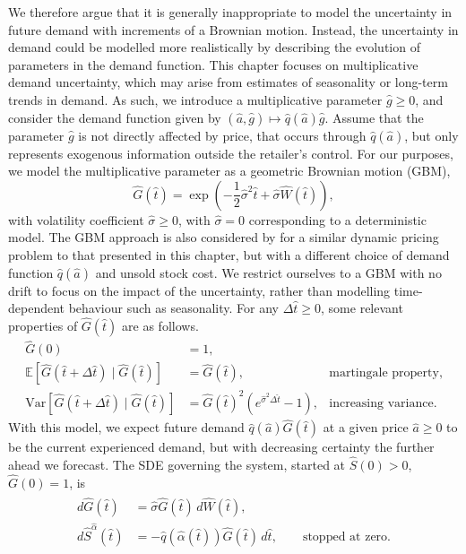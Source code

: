 \documentclass[main.tex]{subfiles}
\begin{document}
We therefore argue that it is generally inappropriate to model the uncertainty
in future demand with increments of a Brownian motion. Instead, the
uncertainty in demand could be modelled more realistically by
describing the evolution of parameters in the demand function.
This chapter focuses on multiplicative demand
uncertainty, which may arise from estimates of seasonality or
long-term trends in demand. As such, we introduce a multiplicative
parameter $\hat{g}\geq 0$, and consider the demand function given by
$({\hat{a}},\hat{g})\mapsto \hat{q}(\hat{a})\hat{g}$.
Assume that the parameter $\hat{g}$ is not directly
affected by price, that occurs through $\hat{q}(\hat{a})$,
but  only represents exogenous information outside the
retailer's control.
For our purposes, we model the multiplicative parameter as
a geometric Brownian motion (GBM),
\begin{equation}
  \hat{G}(\hat{t}) = \exp\left(
    -\frac{1}{2}\hat{\sigma}^2\hat{t} +\hat{\sigma}
    \hat{W}(\hat{t})\right),
\end{equation}
with volatility coefficient
$\hat{\sigma}\geq 0$, with $\hat{\sigma}=0$ corresponding to a
deterministic model. The GBM approach is also considered
by \citet{xu2006monopolistic} for a similar dynamic pricing problem to
that presented in this chapter, but with a different choice of demand function
$\hat{q}(\hat{a})$ and unsold stock cost.
We restrict ourselves to a GBM with no
drift to focus on the impact of the uncertainty, rather than modelling
time-dependent behaviour such as seasonality.
For any $\Delta{\hat{t}}\geq 0$, some relevant properties of $\hat{G}(\hat{t})$ are as follows.
\begin{align}
  \hat{G}(0)
  &=1,\\
  \mathbb{E}[\hat{G}(\hat{t}+\Delta{\hat{t}})\mid \hat{G}(\hat{t})]
  &=\hat{G}(\hat{t}),
  &\text{martingale property,}\\
  \mbox{Var}[\hat{G}(\hat{t}+\Delta{\hat{t}})\mid
  \hat{G}(\hat{t})]&={\hat{G}(\hat{t})}^2(e^{\hat{\sigma}^2
                     \Delta{\hat{t}}}-1), & \text{increasing variance.}
\end{align}
With this model, we expect future demand $\hat{q}(\hat{a})\hat{G}(\hat{t})$ at a given price $\hat{a}\geq
0$ to be the current experienced demand, but with decreasing certainty
the further ahead we forecast.
The SDE governing the system, started at
$\hat{S}(0)>0$, $\hat{G}(0)=1$, is
\begin{align}
  \begin{split}\label{eq:gbm_sde}
    d\hat{G}(\hat{t})&=\hat{\sigma} \hat{G}(\hat{t})\,d\hat{W}(\hat{t}),\\
    d\hat{S}^{\hat{\alpha}}(\hat{t})&=-\hat{q}(\hat{\alpha}(\hat{t}))\hat{G}(\hat{t})\,
    d\hat{t},\qquad\text{stopped at zero}.
  \end{split}
\end{align}
\end{document}
